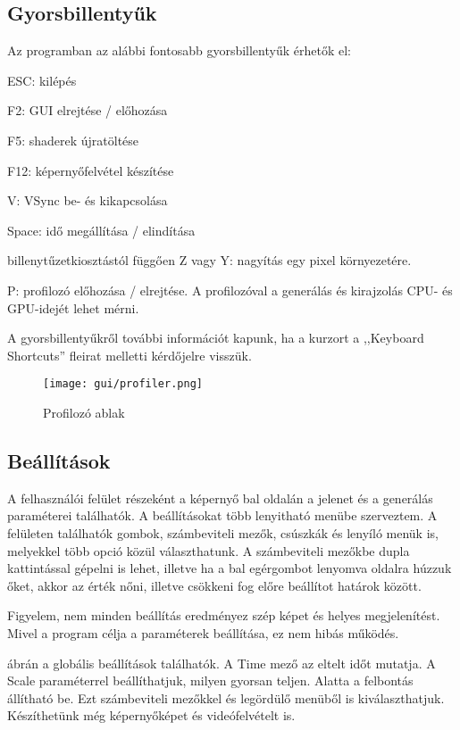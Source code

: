 \subsection{Gyorsbillentyűk}
Az programban az alábbi fontosabb gyorsbillentyűk érhetők el:
\begin{compactenum}
	\item ESC: kilépés
	\item F2: GUI elrejtése / előhozása
	\item F5: shaderek újratöltése
	\item F12: képernyőfelvétel készítése
	\item V: VSync be- és kikapcsolása 
	\item Space: idő megállítása / elindítása
	\item billenytűzetkiosztástól függően Z vagy Y: nagyítás egy pixel környezetére.
	\item P: profilozó előhozása / elrejtése. A profilozóval a generálás és kirajzolás CPU- és GPU-idejét lehet mérni. 
\end{compactenum}
A gyorsbillentyűkről további információt kapunk, ha a kurzort a ,,Keyboard Shortcuts'' fleirat melletti kérdőjelre visszük. 
\begin{figure}[H]
	\centering
	\texttt{[image: gui/profiler.png]}
	\caption{Profilozó ablak}
	\label{fig:profilerp}
\end{figure}

\subsection{Beállítások}

A felhasználói felület részeként a képernyő bal oldalán a jelenet és a generálás paraméterei találhatók. A beállításokat több lenyitható menübe szerveztem. A felületen találhatók gombok, számbeviteli mezők, csúszkák és lenyíló menük is, melyekkel több opció közül választhatunk. A számbeviteli mezőkbe dupla kattintással gépelni is lehet, illetve ha a bal egérgombot lenyomva oldalra húzzuk őket, akkor az érték nőni, illetve csökkeni fog előre beállítot határok között.

Figyelem, nem minden beállítás eredményez szép képet és helyes megjelenítést. Mivel a program célja a paraméterek beállítása, ez nem hibás működés.

 ábrán a globális beállítások találhatók. A Time mező az eltelt időt mutatja. A Scale paraméterrel beállíthatjuk, milyen gyorsan teljen. Alatta a felbontás állítható be. Ezt számbeviteli mezőkkel és legördülő menüből is kiválaszthatjuk. Készíthetünk még képernyőképet és videófelvételt is.

